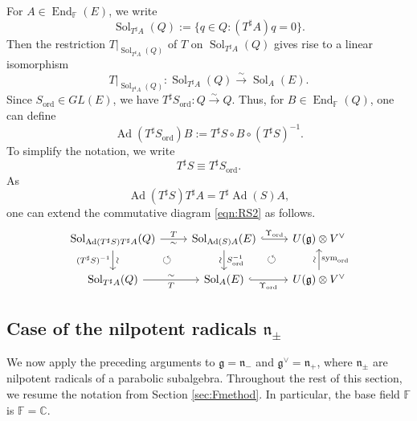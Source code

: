 \documentclass[a4paper,11pt,reqno]{amsart}
\newcommand{\frakg}{\mathfrak{g}}
\newcommand{\frakn}{\mathfrak{n}}
\newcommand{\0}{{\bf 0}}
\newcommand{\C}{\mathbb{C}}
\newcommand{\F}{\mathbb{F}}
\newcommand{\1}{{\bf 1}}
\DeclareMathOperator{\Ad}{Ad}
\DeclareMathOperator{\End}{End}
\newcommand{\ord}{{\mathrm{ord}}}
\DeclareMathOperator{\Sol}{Sol}
\DeclareMathOperator{\To}{\longrightarrow}
\DeclareMathOperator{\sym}{sym}
\theoremstyle{plain}
\theoremstyle{definition}
\numberwithin{equation}{section}
\theoremstyle{definition}
\begin{document}
For $A \in \End_\F(E)$, we write 
\begin{equation*}
\Sol_{T^\sharp A}(Q)
:=\{q \in Q : (T^\sharp A)q=0\}.
\end{equation*}
Then the restriction $T\vert_{\Sol_{T^\sharp A}(Q)}$ of $T$ on 
$\Sol_{T^\sharp A}(Q)$ gives rise to a linear isomorphism
\begin{equation*}
T\vert_{\Sol_{T^\sharp A}(Q)}: \Sol_{T^\sharp A}(Q)
\stackrel{\sim}{\To} 
\Sol_A(E).
\end{equation*}
Since $S_\ord \in GL(E)$, we have
$T^\sharp S_\ord \colon Q \stackrel{\sim}{\to} Q$.
Thus, for $B \in \End_\F(Q)$, one can define
\begin{equation}\label{eqn:adB}
\Ad(T^\sharp S_\ord)B
:= 
T^\sharp S \circ B \circ (T^\sharp S)^{-1}.
\end{equation}
To simplify the notation, we write
\begin{equation*}
T^\sharp S  \equiv T^\sharp S_\ord. 
\end{equation*}
As
\begin{equation*}
\Ad(T^\sharp S)T^\sharp A = T^\sharp \Ad(S)A,
\end{equation*}
one can extend the commutative diagram \eqref{eqn:RS2} as follows.
\begin{equation}\label{eqn:SSSS}
\begin{tikzcd}
	{\Sol_{\Ad(T^\sharp S)T^\sharp A }(Q)} & 
	{\Sol_{\Ad(S)A}(E)} 	\arrow[dl, pos=0.5, phantom, "\circlearrowleft"] 	
	& {U(\frakg)\otimes V^\vee}
	\arrow[dl, pos=0.5, phantom, "\circlearrowleft"]\\
	{\Sol_{T^\sharp A}(Q)} & {\Sol_{A}(E)} & {U(\frakg)\otimes V^\vee}
	\arrow["{T}", "\sim"' , from=1-1, to=1-2]
	\arrow["{\Upsilon_{\ord}}", hook, from=1-2, to=1-3]
	\arrow["\sim" sloped, "(T^\sharp S)^{-1}"', from=1-1, to=2-1]
	\arrow["S_\ord^{-1}", "\sim"' sloped,  from=1-2, to=2-2]
	\arrow["\sim" sloped, "\sym_{\ord}"',  from=2-3, to=1-3]
	\arrow["{\Upsilon_{\ord}}"', hook, from=2-2, to=2-3]
	\arrow["\sim" , "{T}"',  from=2-1, to=2-2]
\end{tikzcd}
\end{equation}

\subsection{Case of the nilpotent radicals \texorpdfstring{$\frakn_\pm$}{n_±}}

We now apply the preceding arguments to
$\frakg=\frakn_-$ and $\frakg^\vee=\frakn_+$,
where $\frakn_\pm$ are nilpotent radicals of a parabolic subalgebra.
Throughout the rest of this section, we resume the notation from Section \ref{sec:Fmethod}. In particular, the base field $\F$ is $\F=\C$.
\end{document}
